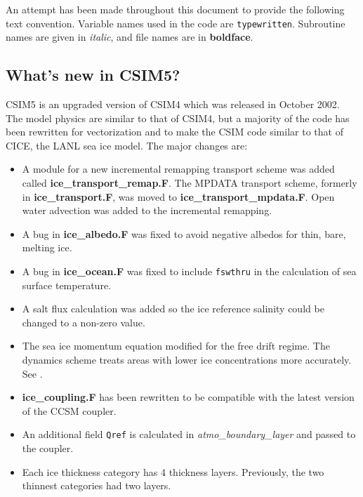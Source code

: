 An attempt has been made throughout this document to provide the following
text convention.  Variable names used in the code are {\tt typewritten}.
Subroutine names are given in {\it italic}, and file names are in {\bf boldface}.

\subsection{What's new in CSIM5?}

CSIM5 is an upgraded version of CSIM4 which was released in October 2002.  
The model physics are similar to that of CSIM4, but a majority of the code
has been rewritten for vectorization and to make the CSIM code similar
to that of CICE, the LANL sea ice model.  The major changes are:

\begin{itemize}

\item A module for a new incremental remapping transport scheme was added
      called {\bf ice\_transport\_remap.F}.  The MPDATA transport scheme,
      formerly in {\bf ice\_transport.F},  was moved to {\bf ice\_transport\_mpdata.F}.
      Open water advection was added to the incremental remapping.

\item A bug in {\bf ice\_albedo.F} was fixed to avoid negative albedos for thin,
      bare, melting ice.

\item A bug in {\bf ice\_ocean.F} was fixed to include {\tt fswthru} in the calculation
      of sea surface temperature.

\item A salt flux calculation was added so the ice reference salinity could
      be changed to a non-zero value.

\item The sea ice momentum equation modified for the free drift regime.  The
      dynamics scheme treats areas with lower ice concentrations more accurately.
      See \cite{hunk03}.

\item {\bf ice\_coupling.F} has been rewritten to be compatible with the latest
      version of the CCSM coupler.

\item An additional field {\tt Qref} is calculated in {\it atmo\_boundary\_layer}
      and passed to the coupler.

\item Each ice thickness category has 4 thickness layers. Previously, the two thinnest
      categories had two layers.


\end{itemize}
